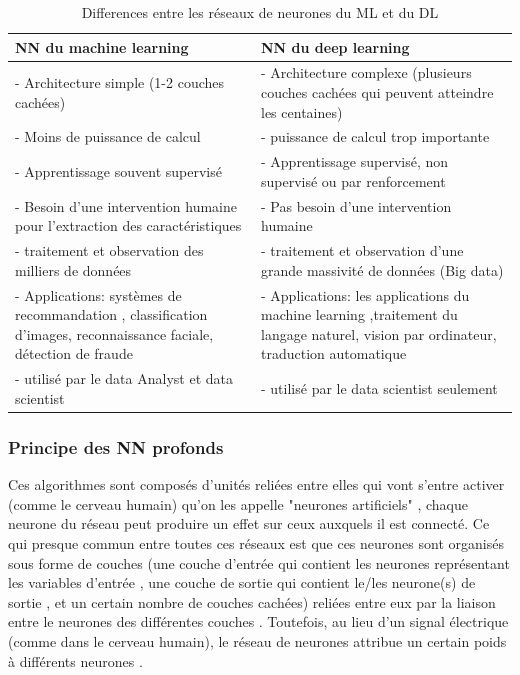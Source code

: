 \begin{center}
\begin{table}[htbp]
\begin{tabular}{|p{8cm}|p{8cm}|}
\hline
\textbf{NN du machine learning} & \textbf{NN du deep learning} \\ \hline
\hline
- Architecture simple (1-2 couches cachées) & - Architecture complexe (plusieurs couches cachées qui peuvent atteindre les centaines) \\
\hline
- Moins de puissance de calcul & - puissance de calcul trop importante \\
\hline
- Apprentissage souvent supervisé & - Apprentissage supervisé, non supervisé ou par renforcement \\
\hline
- Besoin d'une intervention humaine pour l'extraction des caractéristiques & - Pas besoin d'une intervention humaine \\
\hline
- traitement et observation des milliers de données & - traitement et observation d'une grande massivité de données (Big data)\\
\hline
- Applications: systèmes de recommandation , classification d'images, reconnaissance faciale, détection de fraude & - Applications: les applications du machine learning ,traitement du langage naturel, vision par ordinateur, traduction automatique \\
\hline
- utilisé par le data Analyst et data scientist & - utilisé par le data scientist seulement\\
\hline
\end{tabular}
\caption{Differences entre les réseaux de neurones du ML et du DL}
\end{table}
\end{center}


 \subsubsection{Principe des NN profonds}
 Ces algorithmes sont composés d'unités reliées entre elles qui vont s'entre activer (comme le cerveau humain) qu'on les appelle "neurones artificiels" , chaque neurone du réseau peut produire un effet sur ceux auxquels il est connecté. Ce qui presque commun entre toutes ces réseaux est que ces neurones sont organisés sous forme de couches (une couche d'entrée qui contient les neurones représentant les variables d'entrée , une couche de sortie qui contient le/les neurone(s) de sortie , et un certain nombre de couches cachées) reliées entre eux par la liaison entre le neurones des différentes couches . Toutefois, au lieu d'un signal électrique (comme dans le cerveau humain), le réseau de neurones attribue un certain poids à différents neurones .
    
